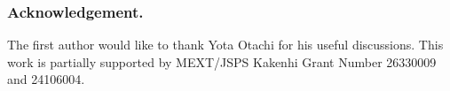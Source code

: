 \documentclass[a4paper]{llncs}
\begin{document}
\subsubsection*{Acknowledgement.}

The first author would like to thank Yota Otachi for his useful discussions. 
This work is partially supported by MEXT/JSPS Kakenhi Grant Number 26330009 and 24106004.








\end{document}
